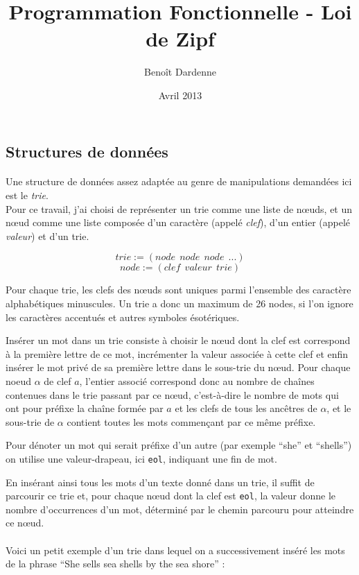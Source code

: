 \documentclass{article}
\title{Programmation Fonctionnelle - Loi de Zipf}
\author{Benoît Dardenne}
\date{Avril 2013}
\begin{document}
\maketitle


\subsection*{Structures de données}
\paragraph{}
Une structure de données assez adaptée au genre de manipulations demandées ici est le \emph{trie}.\\
Pour ce travail, j'ai choisi de représenter un trie comme une liste de nœuds, 
et un nœud comme une liste 
composée d'un caractère (appelé \emph{clef}), d'un entier (appelé \emph{valeur}) et d'un trie.

\[
   trie := (node ~~ node ~~ node ~~ ...) 
\]
\[
   node := (clef ~~ valeur ~~ trie)
\]
 
Pour chaque trie, les clefs des nœuds sont uniques parmi l'ensemble des caractère alphabétiques 
minuscules. Un trie a donc un maximum de 26 nodes, si l'on ignore les caractères accentués et autres 
symboles ésotériques.

Insérer un mot dans un trie consiste à choisir le nœud dont la clef est correspond à la première lettre
de ce mot, incrémenter la valeur associée à cette clef et enfin insérer le mot privé de sa première lettre
dans le sous-trie du nœud. Pour chaque noeud $\alpha$ de clef $a$, l'entier associé correspond donc
au nombre de chaînes contenues dans le trie passant par ce nœud,
c'est-à-dire le nombre de mots qui ont pour préfixe la chaîne formée par $a$ et les clefs de 
tous les ancêtres de $\alpha$, 
et le sous-trie de $\alpha$ contient toutes les mots commençant par ce même préfixe. 

Pour dénoter un mot qui serait préfixe d'un autre (par exemple ``she'' et ``shells'') on utilise une
valeur-drapeau, ici \verb#eol#, indiquant une fin de mot.

En insérant ainsi tous les mots d'un texte donné dans un trie, il suffit de parcourir ce trie et,
pour chaque nœud dont la clef est \verb#eol#, la valeur donne le nombre d'occurrences d'un mot, déterminé 
par le chemin parcouru pour atteindre ce nœud.

\paragraph{}
Voici un petit exemple d'un trie dans lequel on a successivement inséré les mots de la phrase
``She sells sea shells by the sea shore'' :
\end{document}
